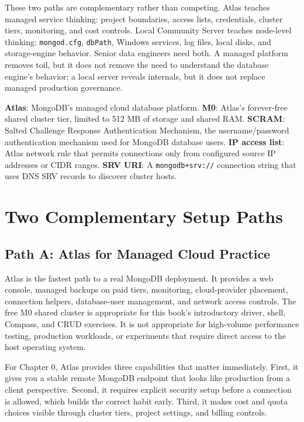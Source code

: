 These two paths are complementary rather than competing. Atlas teaches managed service thinking: project boundaries, access lists, credentials, cluster tiers, monitoring, and cost controls. Local Community Server teaches node-level thinking: \texttt{mongod.cfg}, \texttt{dbPath}, Windows services, log files, local disks, and storage-engine behavior. Senior data engineers need both. A managed platform removes toil, but it does not remove the need to understand the database engine's behavior; a local server reveals internals, but it does not replace managed production governance.

\begin{keyterms}
\textbf{Atlas}: MongoDB's managed cloud database platform. \textbf{M0}: Atlas's forever-free shared cluster tier, limited to 512 MB of storage and shared RAM. \textbf{SCRAM}: Salted Challenge Response Authentication Mechanism, the username/password authentication mechanism used for MongoDB database users. \textbf{IP access list}: Atlas network rule that permits connections only from configured source IP addresses or CIDR ranges. \textbf{SRV URI}: A \texttt{mongodb+srv://} connection string that uses DNS SRV records to discover cluster hosts.
\end{keyterms}

\section{Two Complementary Setup Paths}
\subsection{Path A: Atlas for Managed Cloud Practice}
Atlas is the fastest path to a real MongoDB deployment. It provides a web console, managed backups on paid tiers, monitoring, cloud-provider placement, connection helpers, database-user management, and network access controls. The free M0 shared cluster is appropriate for this book's introductory driver, shell, Compass, and CRUD exercises. It is not appropriate for high-volume performance testing, production workloads, or experiments that require direct access to the host operating system.

For Chapter 0, Atlas provides three capabilities that matter immediately. First, it gives you a stable remote MongoDB endpoint that looks like production from a client perspective. Second, it requires explicit security setup before a connection is allowed, which builds the correct habit early. Third, it makes cost and quota choices visible through cluster tiers, project settings, and billing controls.

